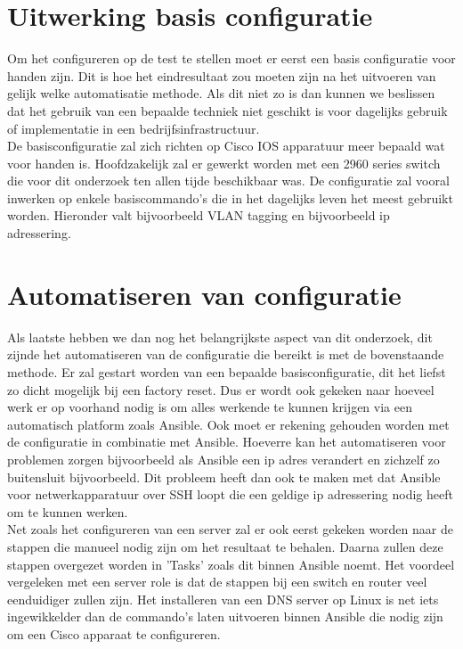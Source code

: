\section{Uitwerking basis configuratie}
\label{ch:configuratie}

Om het configureren op de test te stellen moet er eerst een basis configuratie voor handen zijn. Dit is hoe het eindresultaat zou moeten zijn na het uitvoeren van gelijk welke automatisatie methode. Als dit niet zo is dan kunnen we beslissen dat het gebruik van een bepaalde techniek niet geschikt is voor dagelijks gebruik of implementatie in een bedrijfsinfrastructuur.
\\

De basisconfiguratie zal zich richten op Cisco IOS apparatuur meer bepaald wat voor handen is. Hoofdzakelijk zal er gewerkt worden met een 2960 series switch die voor dit onderzoek ten allen tijde beschikbaar was. De configuratie zal vooral inwerken op enkele basiscommando's die in het dagelijks leven het meest gebruikt worden. Hieronder valt bijvoorbeeld VLAN tagging en bijvoorbeeld ip adressering. 

\section{Automatiseren van configuratie}
\label{ch:automatiseren}

Als laatste hebben we dan nog het belangrijkste aspect van dit onderzoek, dit zijnde het automatiseren van de configuratie die bereikt is met de bovenstaande methode. Er zal gestart worden van een bepaalde basisconfiguratie, dit het liefst zo dicht mogelijk bij een factory reset. Dus er wordt ook gekeken naar hoeveel werk er op voorhand nodig is om alles werkende te kunnen krijgen via een automatisch platform zoals Ansible. Ook moet er rekening gehouden worden met de configuratie in combinatie met Ansible. Hoeverre kan het automatiseren voor problemen zorgen bijvoorbeeld als Ansible een ip adres verandert en zichzelf zo buitensluit bijvoorbeeld. Dit probleem heeft dan ook te maken met dat Ansible voor netwerkapparatuur over SSH loopt die een geldige ip adressering nodig heeft om te kunnen werken.
\\

Net zoals het configureren van een server zal er ook eerst gekeken worden naar de stappen die manueel nodig zijn om het resultaat te behalen. Daarna zullen deze stappen overgezet worden in 'Tasks' zoals dit binnen Ansible noemt. Het voordeel vergeleken met een server role is dat de stappen bij een switch en router veel eenduidiger zullen zijn. Het installeren van een DNS server op Linux is net iets ingewikkelder dan de commando's laten uitvoeren binnen Ansible die nodig zijn om een Cisco apparaat te configureren.


